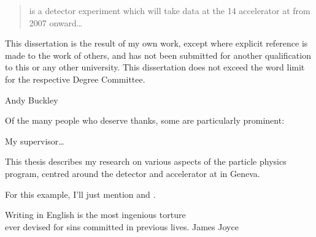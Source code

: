 
\begin{abstract}%
  \LHCb is a \bphysics detector experiment which will take data at 
  the \unit{14}{\TeV} \LHC accelerator at \CERN from 2007 onward\dots
\end{abstract}


\begin{declaration}
  This dissertation is the result of my own work, except where explicit
  reference is made to the work of others, and has not been submitted
  for another qualification to this or any other university. This 
  dissertation does not exceed the word limit for the respective Degree 
  Committee.
  \vspace*{1cm}
  \begin{flushright}
    Andy Buckley
  \end{flushright}
\end{declaration}


\begin{acknowledgements}
  Of the many people who deserve thanks, some are particularly prominent:

  \noindent
  My supervisor\dots
\end{acknowledgements}


\begin{preface}
  This thesis describes my research on various aspects of the \LHCb
  particle physics program, centred around the \LHCb detector and \LHC
  accelerator at \CERN in Geneva.
  
  \noindent
  For this example, I'll just mention  
  and .
\end{preface}

\tableofcontents

\frontquote%
  {Writing in English is the most ingenious torture\\ 
   ever devised for sins committed in previous lives.}%
  {James Joyce}

